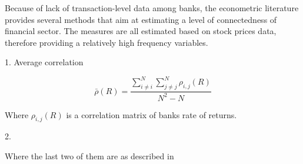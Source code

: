 \documentclass{article}
\begin{document}
Because of lack of transaction-level data among banks, the econometric literature provides several methods that aim at estimating a level of connectedness of financial sector. The measures are all estimated based on stock prices data, therefore providing a relatively high frequency variables. 

1. Average correlation 

\[\bar{\rho}(R) = \frac{\sum_{i \neq i}^{N} \sum_{j \neq j}^{N} \rho_{i,j}(R)}{N^2-N}\]

Where $\rho_{i,j}(R)$ is a correlation matrix of banks rate of returns.

2. 


Where the last two of them are as described in \citet{billio}

\subsection*{}


\end{document}

